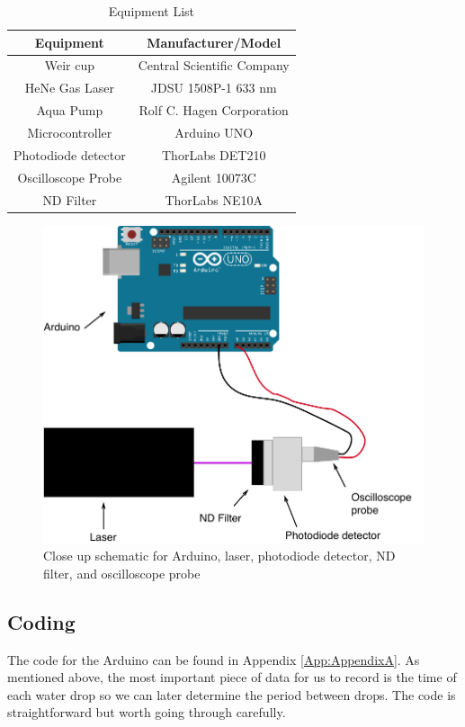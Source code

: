 \documentclass[11pt]{article}
\begin{document}
\begin{table}[htp]
\begin{center}
\begin{tabular}{|c|c|}
\hline 
\textbf{Equipment} & \textbf{Manufacturer/Model} \\
\hline 
Weir cup & Central Scientific Company \\
\hline
HeNe Gas Laser & JDSU 1508P-1 633 nm\\
\hline 
Aqua Pump & Rolf C. Hagen Corporation \\
\hline 
Microcontroller & Arduino UNO \\
\hline
Photodiode detector & ThorLabs DET210 \\
\hline 
Oscilloscope Probe & Agilent 10073C \\
\hline 
ND Filter & ThorLabs NE10A \\
\hline 
\end{tabular} 
\caption{Equipment List}
\end{center}
\label{defaulttable}
\end{table}

\newpage
\begin{figure}[htp]
\begin{center}
\includegraphics[width=4.9in]{figs/wiring}
\caption{Close up schematic for Arduino, laser, photodiode detector, ND filter, and oscilloscope probe}
\label{wiring}
\end{center}
\end{figure}

\newpage
\subsection{Coding}
The code for the Arduino can be found in Appendix \ref{App:AppendixA}. As mentioned above, the most important piece of data for us to record is the time of each water drop so we can later determine the period between drops. The code is straightforward but worth going through carefully.
\end{document}
